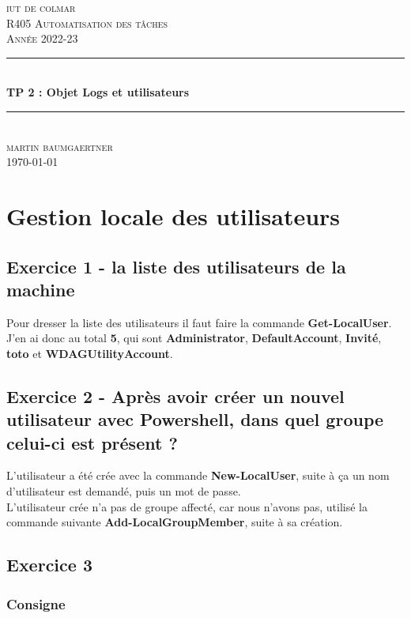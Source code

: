 \documentclass[12pt, a4paper]{article}
\begin{document}
\begin{titlepage}
	\newcommand{\HRule}{\rule{\linewidth}{0.5mm}} 
	\center 
	\textsc{\LARGE iut de colmar}\\[6.5cm] 
	\textsc{\Large R405 Automatisation des tâches}\\[0.5cm] 
	\textsc{\large Année 2022-23}\\[0.5cm]
	\HRule\\[0.75cm]
	{\huge\bfseries TP 2 : Objet Logs et utilisateurs}\\[0.4cm]
	\HRule\\[1.5cm]
	\textsc{\large martin baumgaertner}\\[6.5cm] 

	\vfill\vfill\vfill
	{\large\today} 
	\vfill
\end{titlepage}
\newpage
\tableofcontents
\newpage
\section{Gestion locale des utilisateurs}
\subsection{Exercice 1 - la liste des utilisateurs de la machine}
Pour dresser la liste des utilisateurs il faut faire la commande 
\textbf{Get-LocalUser}. J'en ai donc au total \textbf{5}, qui sont 
\textbf{Administrator}, \textbf{DefaultAccount}, \textbf{Invité},
\textbf{toto} et \textbf{WDAGUtilityAccount}.\\

\subsection{Exercice 2 - Après avoir créer un nouvel utilisateur avec Powershell, dans quel groupe celui-ci est présent ?}
L'utilisateur a été crée avec la commande \textbf{New-LocalUser}, suite à ça
un nom d'utilisateur est demandé, puis un mot de passe.\\
L'utilisateur crée n'a pas de groupe affecté, car nous n'avons pas, utilisé 
la commande suivante \textbf{Add-LocalGroupMember}, suite à sa création. 

\subsection{Exercice 3}
\subsubsection*{Consigne}
\end{document}
